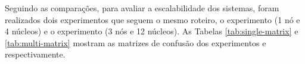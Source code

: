 




Seguindo as comparações, para avaliar a escalabilidade dos sistemas, foram
realizados dois experimentos que seguem o mesmo roteiro, o experimento \expC (1 nó e
4 núcleos) e o experimento \expD (3 nós e 12 núcleos).
As Tabelas \ref{tab:single-matrix} e \ref{tab:multi-matrix} mostram as matrizes
de confusão dos experimentos \expC e \expD respectivamente.

